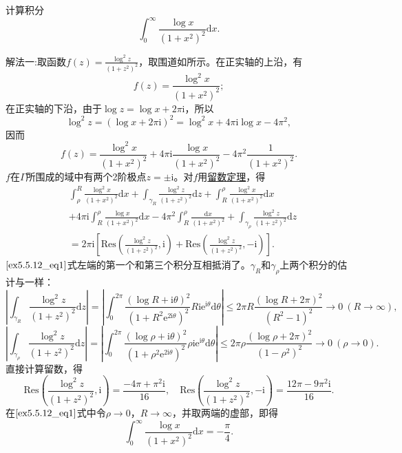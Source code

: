 \documentclass[../../main.tex]{subfiles}
\begin{document}
\begin{example}
计算积分
\[
\int_{0}^{\infty} \frac{\log x}{(1 + x^2)^2} \mathrm{d}x.
\]
\end{example}
\begin{solution}
{\color{blue}解法一:}取函数\( f(z) = \frac{\log^2 z}{(1 + z^2)^2} \)，取围道如所示。在正实轴的上沿，有
\[
f(z) = \frac{\log^2 x}{(1 + x^2)^2};
\]
在正实轴的下沿，由于\( \log z = \log x + 2\pi \mathrm{i} \)，所以
\[
\log^2 z = (\log x + 2\pi \mathrm{i})^2
= \log^2 x + 4\pi \mathrm{i} \log x - 4\pi^2,
\]
因而
\[
f(z) = \frac{\log^2 x}{(1 + x^2)^2} + 4\pi \mathrm{i} \frac{\log x}{(1 + x^2)^2} - 4\pi^2 \frac{1}{(1 + x^2)^2}.
\]
\( f \)在\( \Gamma \)所围成的域中有两个2阶极点\( z = \pm \mathrm{i} \)。对\( f \)用\hyperref[theorem:留数定理(残数定理)-定理5.4.9]{留数定理}，得
\begin{align}
&\int_{\rho}^{R} \frac{\log^2 x}{(1 + x^2)^2} \mathrm{d}x + \int_{\gamma_R} \frac{\log^2 z}{(1 + z^2)^2} \mathrm{d}z + \int_{R}^{\rho} \frac{\log^2 x}{(1 + x^2)^2} \mathrm{d}x
\nonumber\\
&+ 4\pi \mathrm{i} \int_{R}^{\rho} \frac{\log x}{(1 + x^2)^2} \mathrm{d}x - 4\pi^2 \int_{R}^{\rho} \frac{\mathrm{d}x}{(1 + x^2)^2} + \int_{\gamma_{\rho}} \frac{\log^2 z}{(1 + z^2)^2} \mathrm{d}z
\nonumber\\
&= 2\pi \mathrm{i} \left[ \mathrm{Res}\left( \frac{\log^2 z}{(1 + z^2)^2}, \mathrm{i} \right) + \mathrm{Res}\left( \frac{\log^2 z}{(1 + z^2)^2}, -\mathrm{i} \right) \right]. \label{ex5.5.12_eq1}
\end{align}
\(\eqref{ex5.5.12_eq1}\)式左端的第一个和第三个积分互相抵消了。\( \gamma_R \)和\( \gamma_{\rho} \)上两个积分的估计与一样：
\[
\left| \int_{\gamma_R} \frac{\log^2 z}{(1 + z^2)^2} \mathrm{d}z \right| = \left| \int_{0}^{2\pi} \frac{(\log R + \mathrm{i}\theta)^2}{(1 + R^2 \mathrm{e}^{2\mathrm{i}\theta})^2} R\mathrm{i}\mathrm{e}^{\mathrm{i}\theta} \mathrm{d}\theta \right|
\leqslant 2\pi R \frac{(\log R + 2\pi)^2}{(R^2 - 1)^2}
\to 0 \ (R \to \infty),
\]
\[
\left| \int_{\gamma_{\rho}} \frac{\log^2 z}{(1 + z^2)^2} \mathrm{d}z \right| = \left| \int_{0}^{2\pi} \frac{(\log \rho + \mathrm{i}\theta)^2}{(1 + \rho^2 \mathrm{e}^{2\mathrm{i}\theta})^2} \rho\mathrm{i}\mathrm{e}^{\mathrm{i}\theta} \mathrm{d}\theta \right|
\leqslant 2\pi \rho \frac{(\log \rho + 2\pi)^2}{(1 - \rho^2)^2}
\to 0 \ (\rho \to 0).
\]
直接计算留数，得
\[
\mathrm{Res}\left( \frac{\log^2 z}{(1 + z^2)^2}, \mathrm{i} \right) = \frac{-4\pi + \pi^2 \mathrm{i}}{16},
\quad
\mathrm{Res}\left( \frac{\log^2 z}{(1 + z^2)^2}, -\mathrm{i} \right) = \frac{12\pi - 9\pi^2 \mathrm{i}}{16}.
\]
在\(\eqref{ex5.5.12_eq1}\)式中令\( \rho \to 0 \)，\( R \to \infty \)，并取两端的虚部，即得
\[
\int_{0}^{\infty} \frac{\log x}{(1 + x^2)^2} \mathrm{d}x = -\frac{\pi}{4}.
\]


\end{solution}
\end{document}
